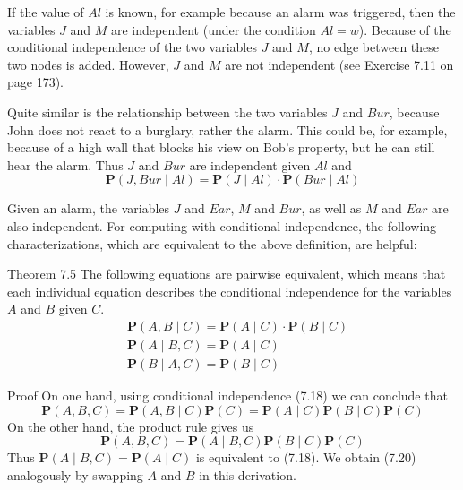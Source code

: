 \documentclass[10pt]{book}
\begin{document}
If the value of $Al$ is known, for example because an alarm was triggered, then the variables $J$ and $M$ are independent (under the condition $Al=w$). Because of the conditional independence of the two variables $J$ and $M$, no edge between these two nodes is added. However, $J$ and $M$ are not independent (see Exercise 7.11 on page 173).

Quite similar is the relationship between the two variables $J$ and $Bur$, because John does not react to a burglary, rather the alarm. This could be, for example, because of a high wall that blocks his view on Bob's property, but he can still hear the alarm. Thus $J$ and $Bur$ are independent given $Al$ and
$$
\boldsymbol{P}(J, Bur \mid Al)=\boldsymbol{P}(J \mid Al) \cdot \boldsymbol{P}(Bur \mid Al)
$$

Given an alarm, the variables $J$ and $Ear$, $M$ and $Bur$, as well as $M$ and $Ear$ are also independent. For computing with conditional independence, the following characterizations, which are equivalent to the above definition, are helpful:

Theorem 7.5 The following equations are pairwise equivalent, which means that each individual equation describes the conditional independence for the variables $A$ and $B$ given $C$.
\begin{align*}
& \boldsymbol{P}(A, B \mid C)=\boldsymbol{P}(A \mid C) \cdot \boldsymbol{P}(B \mid C)  \tag{7.18}\\
& \boldsymbol{P}(A \mid B, C)=\boldsymbol{P}(A \mid C)  \tag{7.19}\\
& \boldsymbol{P}(B \mid A, C)=\boldsymbol{P}(B \mid C) \tag{7.20}
\end{align*}

Proof On one hand, using conditional independence (7.18) we can conclude that
$$
\boldsymbol{P}(A, B, C)=\boldsymbol{P}(A, B \mid C) \boldsymbol{P}(C)=\boldsymbol{P}(A \mid C) \boldsymbol{P}(B \mid C) \boldsymbol{P}(C)
$$
On the other hand, the product rule gives us
$$
\boldsymbol{P}(A, B, C)=\boldsymbol{P}(A \mid B, C) \boldsymbol{P}(B \mid C) \boldsymbol{P}(C)
$$
Thus $\boldsymbol{P}(A \mid B, C)=\boldsymbol{P}(A \mid C)$ is equivalent to (7.18). We obtain (7.20) analogously by swapping $A$ and $B$ in this derivation.
\end{document}
